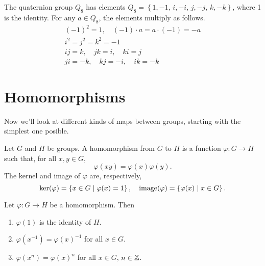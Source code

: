\documentclass[../m171main.tex]{subfiles}
\begin{document}
\begin{definition}
    The quaternion group $Q_8$ has elements $Q_8 = \left\{ 1, -1, \, i, -i, \, j, -j, \, k, -k \right\}$, where 1 is the identity.
    For any $a \in Q_8$, the elements multiply as follows.
    \begin{gather*}
        (-1)^2 = 1, \quad (-1) \cdot a = a \cdot (-1) = -a \\
        i^2 = j^2 = k^2 = -1 \\
        ij = k, \quad jk = i, \quad ki = j \\
        ji = -k, \quad kj = -i, \quad ik = -k
    \end{gather*}
\end{definition}



\section{Homomorphisms}
Now we'll look at different kinds of maps between groups, starting with the simplest one posible.

\begin{definition}[Homomorphism]
    Let $G$ and $H$ be groups.
    A homomorphism from $G$ to $H$ is a function $\varphi : G \to H$ such that, for all $x,y \in G$,
    \[ \varphi(xy) = \varphi(x) \varphi(y). \]
    The kernel and image of $\varphi$ are, respectively,
    \[ \ker (\varphi) = \left\{ x \in G \; | \; \varphi(x) = 1 \right\}, \quad \textrm{image} (\varphi) = \left\{ \varphi(x) \; | \; x \in G \right\}. \]
\end{definition}


\begin{theorem}[]
    Let $\varphi : G \to H$ be a homomorphism.
    Then
    \begin{enumerate}[label=(\alph*)]
        \item $\varphi(1)$ is the identity of $H$.
        \item $\varphi(x^{-1}) = \varphi(x)^{-1}$ for all $x \in G$.
        \item $\varphi(x^{n}) = \varphi(x)^{n}$ for all $x \in G$, $n \in \mathbb{Z}$.
    \end{enumerate}
\end{theorem}
\end{document}
